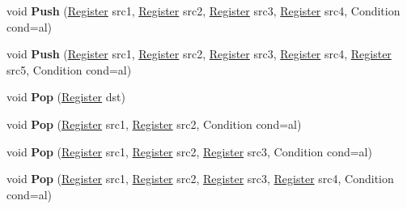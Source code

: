 \begin{DoxyCompactItemize}
\item 
\mbox{\label{classv8_1_1internal_1_1TurboAssembler_a3c91b1d5f61697b06393882ed8d3da59}} 
void {\bfseries Push} (\mbox{\hyperlink{classv8_1_1internal_1_1Register}{Register}} src1, \mbox{\hyperlink{classv8_1_1internal_1_1Register}{Register}} src2, \mbox{\hyperlink{classv8_1_1internal_1_1Register}{Register}} src3, \mbox{\hyperlink{classv8_1_1internal_1_1Register}{Register}} src4, Condition cond=al)
\item 
\mbox{\label{classv8_1_1internal_1_1TurboAssembler_aaf221496732a3cfe456ea8f08ab6ca29}} 
void {\bfseries Push} (\mbox{\hyperlink{classv8_1_1internal_1_1Register}{Register}} src1, \mbox{\hyperlink{classv8_1_1internal_1_1Register}{Register}} src2, \mbox{\hyperlink{classv8_1_1internal_1_1Register}{Register}} src3, \mbox{\hyperlink{classv8_1_1internal_1_1Register}{Register}} src4, \mbox{\hyperlink{classv8_1_1internal_1_1Register}{Register}} src5, Condition cond=al)
\item 
\mbox{\label{classv8_1_1internal_1_1TurboAssembler_ae9f509e9775eb9218c242f6e34cb3fd7}} 
void {\bfseries Pop} (\mbox{\hyperlink{classv8_1_1internal_1_1Register}{Register}} dst)
\item 
\mbox{\label{classv8_1_1internal_1_1TurboAssembler_ae40421d885da68523322761430cd604d}} 
void {\bfseries Pop} (\mbox{\hyperlink{classv8_1_1internal_1_1Register}{Register}} src1, \mbox{\hyperlink{classv8_1_1internal_1_1Register}{Register}} src2, Condition cond=al)
\item 
\mbox{\label{classv8_1_1internal_1_1TurboAssembler_a53e4a303af1c6b5143fb26e728535e79}} 
void {\bfseries Pop} (\mbox{\hyperlink{classv8_1_1internal_1_1Register}{Register}} src1, \mbox{\hyperlink{classv8_1_1internal_1_1Register}{Register}} src2, \mbox{\hyperlink{classv8_1_1internal_1_1Register}{Register}} src3, Condition cond=al)
\item 
\mbox{\label{classv8_1_1internal_1_1TurboAssembler_a2b9f3b15053a121a1a1ecfffd2b94ae4}} 
void {\bfseries Pop} (\mbox{\hyperlink{classv8_1_1internal_1_1Register}{Register}} src1, \mbox{\hyperlink{classv8_1_1internal_1_1Register}{Register}} src2, \mbox{\hyperlink{classv8_1_1internal_1_1Register}{Register}} src3, \mbox{\hyperlink{classv8_1_1internal_1_1Register}{Register}} src4, Condition cond=al)

\end{DoxyCompactItemize}
